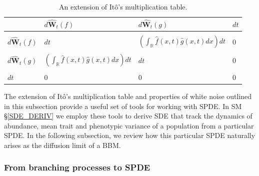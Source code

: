 \documentclass[]{elsarticle} %
\begin{document}
\begin{table}[H]
\centering\caption{An extension of It\^o's multiplication table.}\vspace{0.2cm}
\begin{tabular}{l|lll}
             & $d\hat{\mathbf W}_t(f)$               & $d\hat{\mathbf W}_t(g)$                & $dt$ \\ \hline
             &                            &                            &      \\
$d\hat{\mathbf W}_t(f)$ & $dt$                       & $\left(\int_\mathbb{R}\hat f(x,t)\hat g(x,t)dx\right)dt$ & $0$  \\
             &                            &                            &      \\
$d\hat{\mathbf W}_t(g)$ & $\left(\int_\mathbb{R}\hat f(x,t)\hat g(x,t)dx\right)dt$ & $dt$                       & $0$  \\
             &                            &                            &      \\
$dt$         & $0$                        & $0$                        & $0$
\end{tabular}\label{mult}
\end{table}

The extension of Itô's multiplication table and properties of white
noise outlined in this subsection provide a useful set of tools for
working with SPDE. In SM \S\ref{SDE_DERIV} we employ these tools to
derive SDE that track the dynamics of abundance, mean trait and
phenotypic variance of a population from a particular SPDE. In the
following subsection, we review how this particular SPDE naturally
arises as the diffusion limit of a BBM.

\hypertarget{from-branching-processes-to-spde}{%
\subsubsection{\texorpdfstring{From branching processes to SPDE
\label{stochastic}}{From branching processes to SPDE }}\label{from-branching-processes-to-spde}}
\end{document}
